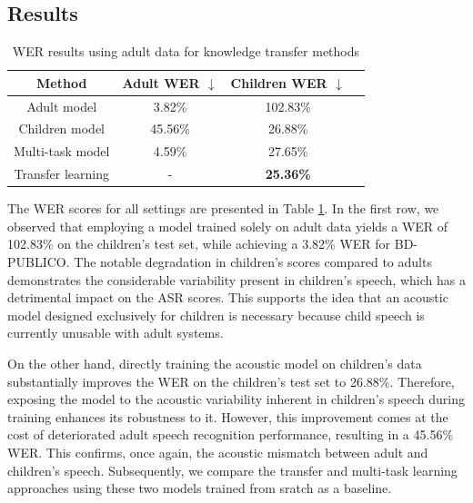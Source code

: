 \subsection{Results}
\begin{table}[h]
\centering
\begin{tabular}{c|ccc}
\hline
 Method & Adult WER $\downarrow$   & Children WER  $\downarrow$   \\ \hline
\multicolumn{1}{c|}{Adult model} & 3.82\%   &  102.83\%\\ 
\multicolumn{1}{c|}{Children model} & 45.56\%  & 26.88\% \\ 
\multicolumn{1}{c|}{Multi-task model}  &   4.59\% &  27.65\% \\ 
\multicolumn{1}{c|}{Transfer learning} &  -  & \textbf{25.36\%} \\ \hline


\end{tabular}

\caption{WER results using adult data for knowledge transfer methods}
\label{tab:res_exp1}
\end{table}

The WER scores for all settings are presented in Table \ref{tab:res_exp1}. In the first row, we observed that employing a model trained solely on adult data yields a WER of 102.83\% on the children's test set, while achieving a 3.82\% WER for BD-PUBLICO. The notable degradation in children's scores compared to adults demonstrates the considerable variability present in children's speech, which has a detrimental impact on the ASR scores. This supports the idea that an acoustic model designed exclusively for children is necessary because child speech is currently unusable with adult systems.

On the other hand, directly training the acoustic model on children's data substantially improves the WER on the children's test set to 26.88\%. Therefore, exposing the model to the acoustic variability inherent in children's speech during training enhances its robustness to it. However, this improvement comes at the cost of deteriorated adult speech recognition performance, resulting in a 45.56\% WER. This confirms, once again, the acoustic mismatch between adult and children's speech. Subsequently, we compare the transfer and multi-task learning approaches using these two models trained from sratch as a baseline.

